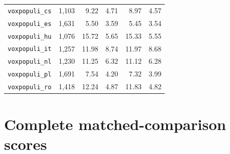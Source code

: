 \begin{table}[!ht]
\begin{tabular}{lrrrrr}
\texttt{voxpopuli\_cs} & 1,103 & 9.22 & 4.71 & 8.97 & 4.57\\
\texttt{voxpopuli\_es} & 1,631 & 5.50 & 3.59 & 5.45 & 3.54\\
\texttt{voxpopuli\_hu} & 1,076 & 15.72 & 5.65 & 15.33 & 5.55\\
\texttt{voxpopuli\_it} & 1,257 & 11.98 & 8.74 & 11.97 & 8.68\\
\texttt{voxpopuli\_nl} & 1,230 & 11.25 & 6.32 & 11.12 & 6.28\\
\texttt{voxpopuli\_pl} & 1,691 & 7.54 & 4.20 & 7.32 & 3.99\\
\texttt{voxpopuli\_ro} & 1,418 & 12.24 & 4.87 & 11.83 & 4.82\\
\bottomrule
\end{tabular}
\end{table}
\clearpage
\section{Complete matched-comparison scores}

